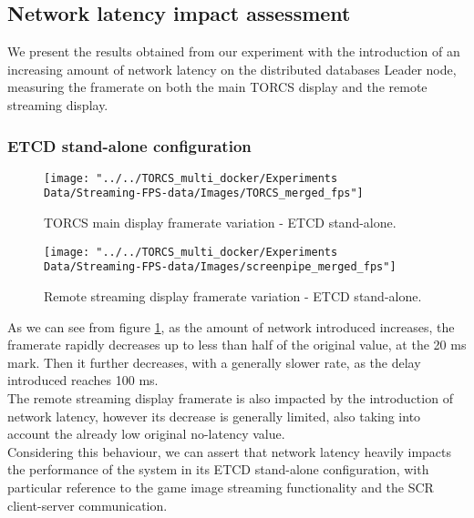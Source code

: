 \subsection{Network latency impact assessment}
We present the results obtained from our experiment with the introduction of an increasing amount of network latency on the distributed databases Leader node, measuring the framerate on both the main TORCS display and the remote streaming display.
\subsubsection{ETCD stand-alone configuration}
\begin{figure}[h!]
	\centering
	\texttt{[image: "../../TORCS\_multi\_docker/Experiments Data/Streaming-FPS-data/Images/TORCS\_merged\_fps"]}
	\caption[TORCS main display framerate variation - ETCD stand-alone]{TORCS main display framerate variation - ETCD stand-alone.}
	\label{fig:torcs-merged-fps-etcd}
\end{figure}
\begin{figure}[h!]
	\centering
	\texttt{[image: "../../TORCS\_multi\_docker/Experiments Data/Streaming-FPS-data/Images/screenpipe\_merged\_fps"]}
	\caption[Remote streaming display framerate variation - ETCD stand-alone]{Remote streaming display framerate variation - ETCD stand-alone.}
	\label{fig:screenpipe-merged-fps-etcd}
\end{figure}
As we can see from figure \ref{fig:torcs-merged-fps-etcd}, as the amount of network introduced increases, the framerate rapidly decreases up to less than half of the original value, at the 20 ms mark. Then it further decreases, with a generally slower rate, as the delay introduced reaches 100 ms. \\
The remote streaming display framerate is also impacted by the introduction of network latency, however its decrease is generally limited, also taking into account the already low original no-latency value. \\
Considering this behaviour, we can assert that network latency heavily impacts the performance of the system in its ETCD stand-alone configuration, with particular reference to the game image streaming functionality and the SCR client-server communication. 


